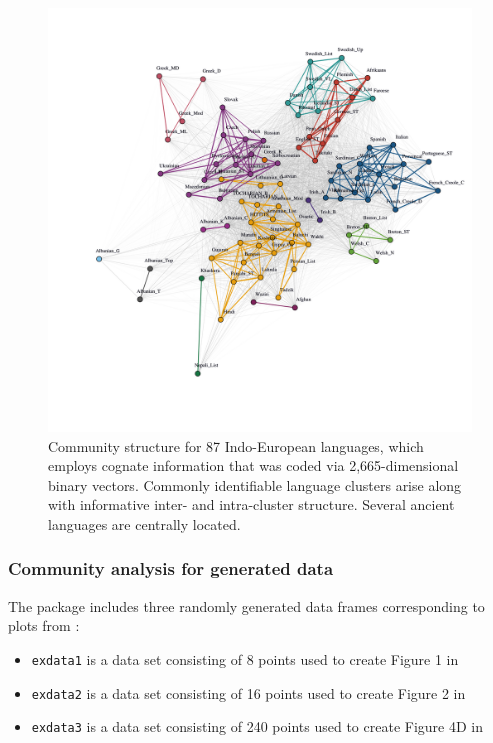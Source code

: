 \begin{Schunk}
\begin{figure}[H]
\includegraphics[width=5.5in,trim=0in 5in 0in 1in,clip]{fig6} \caption[Community structure for 87 Indo-European languages, which employs cognate information that was coded via 2,665-dimensional binary vectors]{Community structure for 87 Indo-European languages, which employs cognate information that was coded via 2,665-dimensional binary vectors. Commonly identifiable language clusters arise along with informative inter- and intra-cluster structure. Several ancient languages are centrally located.}\label{fig:figlang}
\end{figure}
\end{Schunk}

\hypertarget{community-analysis-for-generated-data}{%
\subsubsection{Community analysis for generated
data}\label{community-analysis-for-generated-data}}

The  package includes three randomly generated data frames
corresponding to plots from \citet{berenhaut2022social}:

\begin{itemize}
\tightlist
\item
  \texttt{exdata1} is a data set consisting of 8 points used to create
  Figure 1 in \citet{berenhaut2022social}
\item
  \texttt{exdata2} is a data set consisting of 16 points used to create
  Figure 2 in \citet{berenhaut2022social}
\item
  \texttt{exdata3} is a data set consisting of 240 points used to create
  Figure 4D in \citet{berenhaut2022social}
\end{itemize}

